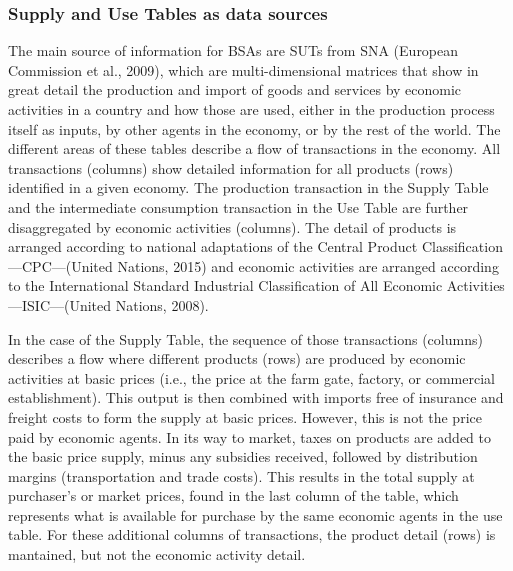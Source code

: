 \documentclass[
  letterpaper,
  DIV=11,
  numbers=noendperiod]{scrartcl}
\begin{document}
\subsubsection{Supply and Use Tables as data
sources}\label{supply-and-use-tables-as-data-sources}

The main source of information for BSAs are SUTs from SNA (European
Commission et al., 2009), which are multi-dimensional matrices that show
in great detail the production and import of goods and services by
economic activities in a country and how those are used, either in the
production process itself as inputs, by other agents in the economy, or
by the rest of the world. The different areas of these tables describe a
flow of transactions in the economy. All transactions (columns) show
detailed information for all products (rows) identified in a given
economy. The production transaction in the Supply Table and the
intermediate consumption transaction in the Use Table are further
disaggregated by economic activities (columns). The detail of products
is arranged according to national adaptations of the Central Product
Classification---CPC---(United Nations, 2015) and economic activities
are arranged according to the International Standard Industrial
Classification of All Economic Activities---ISIC---(United Nations,
2008).

In the case of the Supply Table, the sequence of those transactions
(columns) describes a flow where different products (rows) are produced
by economic activities at basic prices (i.e., the price at the farm
gate, factory, or commercial establishment). This output is then
combined with imports free of insurance and freight costs to form the
supply at basic prices. However, this is not the price paid by economic
agents. In its way to market, taxes on products are added to the basic
price supply, minus any subsidies received, followed by distribution
margins (transportation and trade costs). This results in the total
supply at purchaser's or market prices, found in the last column of the
table, which represents what is available for purchase by the same
economic agents in the use table. For these additional columns of
transactions, the product detail (rows) is mantained, but not the
economic activity detail.
\end{document}
